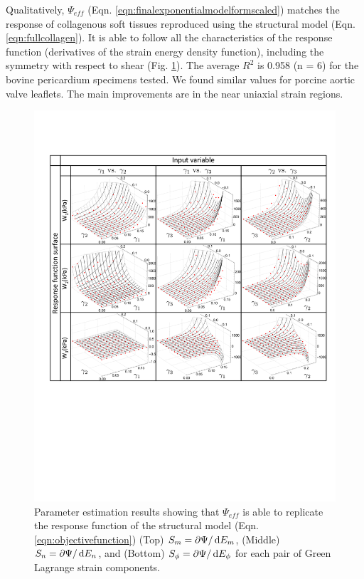     
    Qualitatively, $\Psi_{eff}$ (Eqn. \ref{eqn:finalexponentialmodelformscaled}) matches the response of collagenous soft tissues reproduced using the structural model (Eqn. \ref{eqn:fullcollagen}). It is able to follow all the characteristics of the response function (derivatives of the strain energy density function), including the symmetry with respect to shear (Fig. \ref{fig:modelfit}). The average $R^2$ is 0.958 (n = 6) for the bovine pericardium specimens tested. We found similar values for porcine aortic valve leaflets. The main improvements are in the near uniaxial strain regions. 
\begin{figure}[hptb]
\centering
\includegraphics[width=\textwidth]{Images/chapter5/modelfit}
\caption{Parameter estimation results showing that $\Psi_{eff}$ is able to replicate the response function of the structural model (Eqn. \ref{eqn:objectivefunction}) (Top) $S_m = \partial\Psi/\dif E_m$, (Middle) $S_n = \partial\Psi/\dif E_n$, and (Bottom) $S_\phi = \partial\Psi/\dif E_\phi$ for each pair of Green Lagrange strain components.}
\label{fig:modelfit}
\end{figure} 


